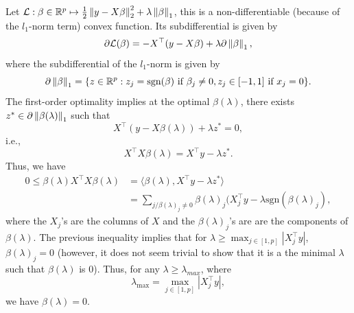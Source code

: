 \documentclass[11pt]{article}
\begin{document}
\begin{solution}
Let $\mathcal{L} : \beta\in\mathbb{R}^p\mapsto \frac{1}{2}\left\lVert y-X\beta\right\rVert^2_2+\lambda \left\lVert\beta\right\rVert_1$, this is a non-differentiable (because of the $l_1$-norm term) convex function. Its subdifferential is given by
%
\begin{equation}
    \partial \mathcal{L}(\beta) = -X^{\top}(y-X\beta)+\lambda\partial\left\lVert\beta\right\rVert_1,
\end{equation}
%
where the subdifferential of the $l_1$-norm is given by
%
\begin{equation}
    \partial\left\lVert\beta\right\rVert_1 = \{z\in \mathbb{R}^p : z_j = \text{sgn}(\beta) \text{ if } \beta_j\neq 0, z_j\in [-1, 1] \text{ if } x_j = 0\}.
\end{equation}
%
The first-order optimality implies at the optimal $\beta(\lambda)$, there exists $z^{*}\in \partial \left\lVert\beta(\lambda)\right\rVert_1$ such that
%
\begin{equation}
    X^{\top}(y-X\beta(\lambda)) + \lambda z^{*} = 0,
\end{equation}
%
i.e.,
%
\begin{equation}
    X^{\top}X \beta(\lambda ) = X^{\top}y-\lambda z^{*}.
\end{equation}
%
Thus, we have
%
\begin{equation}
\begin{split}
    0 \leq \beta(\lambda)X^{\top}X\beta(\lambda) &= \langle \beta(\lambda), X^{\top}y-\lambda z^{*}\rangle\\
    &=\sum_{j/ \beta(\lambda)_j\neq 0}\beta(\lambda)_j (X^{\top}_j y - \lambda \text{sgn}(\beta(\lambda)_j),
\end{split}
\end{equation}
%
where the $X_j$'s are the columns of $X$ and the $\beta(\lambda)_j$'s are are the components of $\beta(\lambda)$.
The previous inequality implies that for $\lambda \geq \max_{j\in [1, p]} |X^{\top}_jy|$, $\beta(\lambda)_j = 0$ (however, it does not seem trivial to show that it is a the minimal $\lambda$ such that $\beta(\lambda)$ is 0). Thus, for any $\lambda\geq \lambda_{max}$, where
\begin{equation}
    \lambda_{\max} =  \max_{j\in [1, p]} |X^{\top}_jy|,
\end{equation}
we have $\beta(\lambda)= 0$.

\end{solution}
\end{document}
